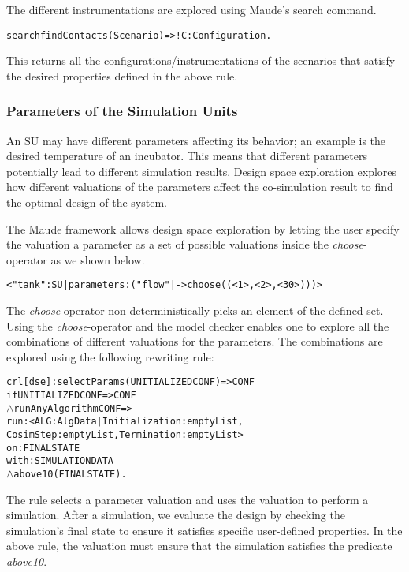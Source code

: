 The different instrumentations are explored using Maude's search command.

\begin{alltt}
  \small
  search findContacts(Scenario) =>! C:Configuration .
\end{alltt}
  
This returns all the configurations/instrumentations of the scenarios that satisfy the desired properties defined in the above rule.

\subsubsection{Parameters of the Simulation Units}
An SU may have different parameters affecting its behavior; an example is the desired temperature of an incubator.
This means that different parameters potentially lead to different simulation results.
Design space exploration explores how different valuations of the parameters affect the co-simulation result to find the optimal design of the system. 

The Maude framework allows design space exploration by letting the user specify the valuation a parameter as a set of possible valuations inside the \emph{choose}-operator as we shown below.
\begin{alltt}
  \small
< "tank" : SU | parameters : ("flow" |-> choose((< 1 >,< 2 >,< 30 >))) >
\end{alltt}

The \emph{choose}-operator non-deterministically picks an element of the defined set.
Using the \emph{choose}-operator and the model checker enables one to explore all the combinations of different valuations for the parameters.
The combinations are explored using the following rewriting rule:

\begin{alltt}
  \small
  crl [dse] : selectParams(UNITIALIZEDCONF) => CONF 
  if UNITIALIZEDCONF => CONF
  \(\land\) runAnyAlgorithm CONF => 
      run: < ALG : AlgData | Initialization : emptyList, 
      CosimStep : emptyList, Termination : emptyList > 
      on: FINALSTATE
      with: SIMULATIONDATA
  \(\land\) above10(FINALSTATE) .
\end{alltt}

The rule selects a parameter valuation and uses the valuation to perform a simulation.
After a simulation, we evaluate the design by checking the simulation's final state to ensure it satisfies specific user-defined properties.
In the above rule, the valuation must ensure that the simulation satisfies the predicate \emph{above10}.

